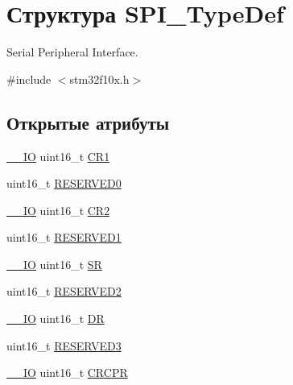 \hypertarget{struct_s_p_i___type_def}{}\section{Структура S\+P\+I\+\_\+\+Type\+Def}
\label{struct_s_p_i___type_def}


Serial Peripheral Interface.  




{\ttfamily \#include $<$stm32f10x.\+h$>$}

\subsection*{Открытые атрибуты}
\begin{DoxyCompactItemize}
\item 
\mbox{\hyperlink{group___c_m_s_i_s___c_m3__core__definitions_gaec43007d9998a0a0e01faede4133d6be}{\+\_\+\+\_\+\+IO}} uint16\+\_\+t \mbox{\hyperlink{struct_s_p_i___type_def_a1e398155ddd013fcdd41309b4bd0bd5f}{C\+R1}}
\item 
uint16\+\_\+t \mbox{\hyperlink{struct_s_p_i___type_def_a7f16c40933b8a713085436be72d30a46}{R\+E\+S\+E\+R\+V\+E\+D0}}
\item 
\mbox{\hyperlink{group___c_m_s_i_s___c_m3__core__definitions_gaec43007d9998a0a0e01faede4133d6be}{\+\_\+\+\_\+\+IO}} uint16\+\_\+t \mbox{\hyperlink{struct_s_p_i___type_def_ac891e34644b8dc27bacc906cfd18b235}{C\+R2}}
\item 
uint16\+\_\+t \mbox{\hyperlink{struct_s_p_i___type_def_a1b7a800c0f56532a431b19cf868e4102}{R\+E\+S\+E\+R\+V\+E\+D1}}
\item 
\mbox{\hyperlink{group___c_m_s_i_s___c_m3__core__definitions_gaec43007d9998a0a0e01faede4133d6be}{\+\_\+\+\_\+\+IO}} uint16\+\_\+t \mbox{\hyperlink{struct_s_p_i___type_def_a017d7d54a7bf1925facea6b5e02fec83}{SR}}
\item 
uint16\+\_\+t \mbox{\hyperlink{struct_s_p_i___type_def_a09ce56649bb5477e2fcf3e92bca8f735}{R\+E\+S\+E\+R\+V\+E\+D2}}
\item 
\mbox{\hyperlink{group___c_m_s_i_s___c_m3__core__definitions_gaec43007d9998a0a0e01faede4133d6be}{\+\_\+\+\_\+\+IO}} uint16\+\_\+t \mbox{\hyperlink{struct_s_p_i___type_def_ae192c943732b6ab5e5611e860cc05544}{DR}}
\item 
uint16\+\_\+t \mbox{\hyperlink{struct_s_p_i___type_def_aeb1d1d561f1d51232369197fa7acb53a}{R\+E\+S\+E\+R\+V\+E\+D3}}
\item 
\mbox{\hyperlink{group___c_m_s_i_s___c_m3__core__definitions_gaec43007d9998a0a0e01faede4133d6be}{\+\_\+\+\_\+\+IO}} uint16\+\_\+t \mbox{\hyperlink{struct_s_p_i___type_def_a353c64e49ec9ae93b950668941f41175}{C\+R\+C\+PR}}

\end{DoxyCompactItemize}
